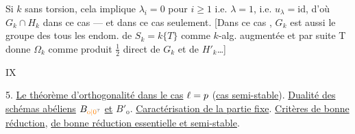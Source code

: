  Si $k$ sans torsion, cela implique $\lambda_i=0$ pour $i\geq1$ i.e. $\lambda=1$, i.e. $u_\lambda=\mathrm{id}$, d'où $G_k\cap H_k$ dans ce cas --- et dans ce cas seulement. \deleted{\unsure{\}}}
[Dans ce cas , $G_k$ est aussi le groupe  des tous les endom. de $S_k=k\{T\}$ comme $k$-alg. augmentée  et par suite  
T
donne $\Omega_k$ comme produit $\frac12$ direct de $G_k$ et de $H'_k$\ldots]


\hfill IX

5. \uline{Le théorème d'orthogonalité dans le cas} $\ell=p$ (\uline{cas semi-stable}). \uline{Dualité des schémas abéliens} $B_{\unsure{\mathrm o|0}}$ \uline{et} $B'_{\mathrm o}$. \uline{Caractérisation de la partie fixe}. \uline{Critères de bonne réduction}, \uline{de bonne réduction essentielle et semi-stable}.

